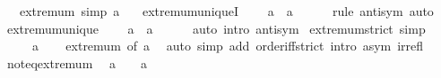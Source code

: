 \begin{isabellebody}
\ \ \ extremum\ {\isacharbrackleft}{\kern0pt}simp{\isacharbrackright}{\kern0pt}{\isacharcolon}{\kern0pt}\ {\isacartoucheopen}a\ \isactrlbold {\isasymle}\ \isactrlbold {\isasymtop}{\isacartoucheclose}\isanewline
{}\isanewline
\isanewline
{}\isamarkupfalse%
\ extremum{\isacharunderscore}{\kern0pt}uniqueI{\isacharcolon}{\kern0pt}\isanewline
\ \ {\isacartoucheopen}\isactrlbold {\isasymtop}\ \isactrlbold {\isasymle}\ a\ {\isasymLongrightarrow}\ a\ {\isacharequal}{\kern0pt}\ \isactrlbold {\isasymtop}{\isacartoucheclose}\isanewline
%
\isadelimproof
\ \ %
\endisadelimproof
%
\isatagproof
{}\isamarkupfalse%
\ {\isacharparenleft}{\kern0pt}rule\ antisym{\isacharparenright}{\kern0pt}\ auto%
\endisatagproof
{\isafoldproof}%
%
\isadelimproof
\isanewline
%
\endisadelimproof
\isanewline
{}\isamarkupfalse%
\ extremum{\isacharunderscore}{\kern0pt}unique{\isacharcolon}{\kern0pt}\isanewline
\ \ {\isacartoucheopen}\isactrlbold {\isasymtop}\ \isactrlbold {\isasymle}\ a\ {\isasymlongleftrightarrow}\ a\ {\isacharequal}{\kern0pt}\ \isactrlbold {\isasymtop}{\isacartoucheclose}\isanewline
%
\isadelimproof
\ \ %
\endisadelimproof
%
\isatagproof
{}\isamarkupfalse%
\ {\isacharparenleft}{\kern0pt}auto\ intro{\isacharcolon}{\kern0pt}\ antisym{\isacharparenright}{\kern0pt}%
\endisatagproof
{\isafoldproof}%
%
\isadelimproof
\isanewline
%
\endisadelimproof
\isanewline
{}\isamarkupfalse%
\ extremum{\isacharunderscore}{\kern0pt}strict\ {\isacharbrackleft}{\kern0pt}simp{\isacharbrackright}{\kern0pt}{\isacharcolon}{\kern0pt}\isanewline
\ \ {\isacartoucheopen}{\isasymnot}\ {\isacharparenleft}{\kern0pt}\isactrlbold {\isasymtop}\ \isactrlbold {\isacharless}{\kern0pt}\ a{\isacharparenright}{\kern0pt}{\isacartoucheclose}\isanewline
%
\isadelimproof
\ \ %
\endisadelimproof
%
\isatagproof
{}\isamarkupfalse%
\ extremum\ {\isacharbrackleft}{\kern0pt}of\ a{\isacharbrackright}{\kern0pt}\ \isamarkupfalse%
\ {\isacharparenleft}{\kern0pt}auto\ simp\ add{\isacharcolon}{\kern0pt}\ order{\isacharunderscore}{\kern0pt}iff{\isacharunderscore}{\kern0pt}strict\ intro{\isacharcolon}{\kern0pt}\ asym\ irrefl{\isacharparenright}{\kern0pt}%
\endisatagproof
{\isafoldproof}%
%
\isadelimproof
\isanewline
%
\endisadelimproof
\isanewline
{}\isamarkupfalse%
\ not{\isacharunderscore}{\kern0pt}eq{\isacharunderscore}{\kern0pt}extremum{\isacharcolon}{\kern0pt}\isanewline
\ \ {\isacartoucheopen}a\ {\isasymnoteq}\ \isactrlbold {\isasymtop}\ {\isasymlongleftrightarrow}\ a\ \isactrlbold {\isacharless}{\kern0pt}\ \isactrlbold {\isasymtop}{\isacartoucheclose}\isanewline

\end{isabellebody}
